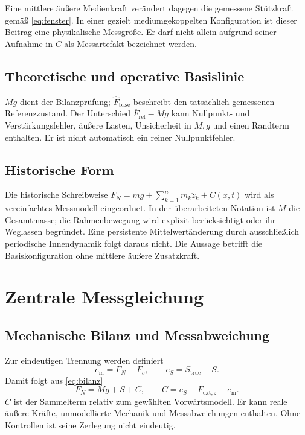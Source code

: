 \documentclass[11pt,a4paper]{article}
\begin{document}
Eine mittlere äußere Medienkraft verändert dagegen die gemessene Stützkraft gemäß \eqref{eq:fenster}. In einer gezielt mediumgekoppelten Konfiguration ist dieser Beitrag eine physikalische Messgröße. Er darf nicht allein aufgrund seiner Aufnahme in $C$ als Messartefakt bezeichnet werden.

\subsection{Theoretische und operative Basislinie}
$Mg$ dient der Bilanzprüfung; $\hat F_{\mathrm{base}}$ beschreibt den tatsächlich gemessenen Referenzzustand. Der Unterschied $\overline F_{\mathrm{ref}}-Mg$ kann Nullpunkt- und Verstärkungsfehler, äußere Lasten, Unsicherheit in $M,g$ und einen Randterm enthalten. Er ist nicht automatisch ein reiner Nullpunktfehler.

\subsection{Historische Form}
Die historische Schreibweise $F_N=mg+\sum_{k=1}^n m_k\ddot z_k+C(x,t)$ wird als vereinfachtes Messmodell eingeordnet. In der überarbeiteten Notation ist $M$ die Gesamtmasse; die Rahmenbewegung wird explizit berücksichtigt oder ihr Weglassen begründet. Eine persistente Mittelwertänderung durch ausschließlich periodische Innendynamik folgt daraus nicht. Die Aussage betrifft die Basiskonfiguration ohne mittlere äußere Zusatzkraft.

\section{Zentrale Messgleichung}\label{sec:messmodell}
\subsection{Mechanische Bilanz und Messabweichung}
Zur eindeutigen Trennung werden definiert
\begin{equation}
e_{\mathrm m}=F_N-F_c,\qquad e_S=S_{\mathrm{true}}-S.
\end{equation}
Damit folgt aus \eqref{eq:bilanz}
\begin{equation}
F_N=Mg+S+C,\qquad C=e_S-F_{\mathrm{ext},z}+e_{\mathrm m}.
\label{eq:messgleichung}
\end{equation}
$C$ ist der Sammelterm relativ zum gewählten Vorwärtsmodell. Er kann reale äußere Kräfte, unmodellierte Mechanik und Messabweichungen enthalten. Ohne Kontrollen ist seine Zerlegung nicht eindeutig.
\end{document}

